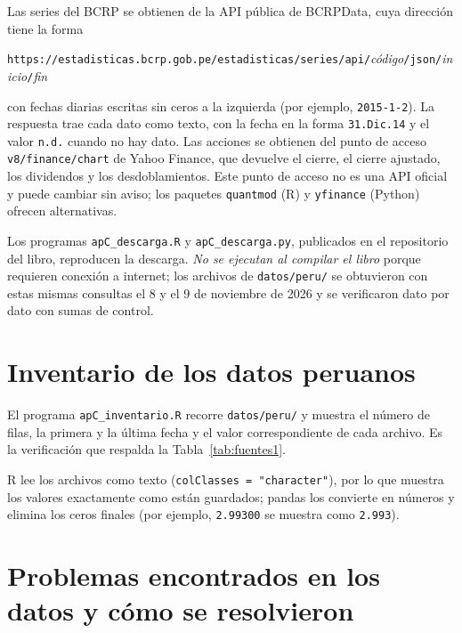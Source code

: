 Las series del BCRP se obtienen de la API pública de BCRPData, cuya dirección tiene la forma
\begin{center}\small
\texttt{https://estadisticas.bcrp.gob.pe/estadisticas/series/api/}\textit{código}\texttt{/json/}\textit{inicio}\texttt{/}\textit{fin}
\end{center}
con fechas diarias escritas sin ceros a la izquierda (por ejemplo, \texttt{2015-1-2}). La respuesta trae
cada dato como texto, con la fecha en la forma \texttt{31.Dic.14} y el valor \texttt{n.d.} cuando no hay
dato. Las acciones se obtienen del punto de acceso \texttt{v8/finance/chart} de Yahoo Finance, que
devuelve el cierre, el cierre ajustado, los dividendos y los desdoblamientos. Este punto de acceso no es
una API oficial y puede cambiar sin aviso; los paquetes \texttt{quantmod} (R) y \texttt{yfinance} (Python)
ofrecen alternativas.

Los programas \texttt{apC\_descarga.R} y \texttt{apC\_descarga.py}, publicados en el repositorio del libro,
reproducen la descarga. \emph{No se ejecutan al compilar el libro} porque requieren conexión a internet;
los archivos de \texttt{datos/peru/} se obtuvieron con estas mismas consultas el 8 y el 9 de noviembre de
2026 y se verificaron dato por dato con sumas de control.


\section{Inventario de los datos peruanos}

El programa \texttt{apC\_inventario.R} recorre \texttt{datos/peru/} y muestra el número de filas, la primera y la última
fecha y el valor correspondiente de cada archivo. Es la verificación que respalda la
Tabla~\ref{tab:fuentes1}.


\RvsPy R lee los archivos como texto (\texttt{colClasses = "character"}), por lo que muestra los
valores exactamente como están guardados; pandas los convierte en números y elimina los ceros finales
(por ejemplo, \texttt{2.99300} se muestra como \texttt{2.993}).

\section{Problemas encontrados en los datos y cómo se resolvieron}

